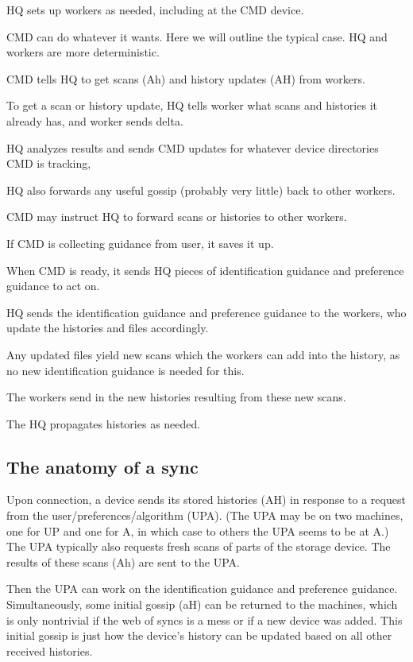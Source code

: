 \documentclass{book}
\begin{document}
HQ sets up workers as needed, including at the CMD device.

CMD can do whatever it wants.  Here we will outline the typical case.  HQ and workers are more deterministic.

CMD tells HQ to get scans (Ah) and history updates (AH) from workers.

	To get a scan or history update, HQ tells worker what scans and histories it already has, and worker sends delta.

HQ analyzes results and sends CMD updates for whatever device directories CMD is tracking,

HQ also forwards any useful gossip (probably very little) back to other workers.

CMD may instruct HQ to forward scans or histories to other workers.

If CMD is collecting guidance from user, it saves it up.

When CMD is ready, it sends HQ pieces of identification guidance and preference guidance to act on.

HQ sends the identification guidance and preference guidance to the workers, who update the histories and files accordingly.

Any updated files yield new scans which the workers can add into the history, as no new identification guidance is needed for this.

The workers send in the new histories resulting from these new scans.

The HQ propagates histories as needed.




\subsection{The anatomy of a sync}

Upon connection, a device sends its stored histories (AH) in response to a request from the user/preferences/algorithm (UPA).
(The UPA may be on two machines, one for UP and one for A, in which case to others the UPA seems to be at A.)
The UPA typically also requests fresh scans of parts of the storage device.
The results of these scans (Ah) are sent to the UPA.

Then the UPA can work on the identification guidance and preference guidance.
Simultaneously, some initial gossip (aH) can be returned to the machines, which is only nontrivial if the web of syncs is a mess or if a new device was added.  This initial gossip is just how the device's history can be updated based on all other received histories.
\end{document}
